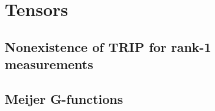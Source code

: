 
\section{Tensors}%
\label{sec:tensors_appendix}


\subsection{Nonexistence of TRIP for rank-1 measurements}
\label{sub:tensors.trip}


\subsection{Meijer G-functions}%
\label{sub:tensors.meijer}

